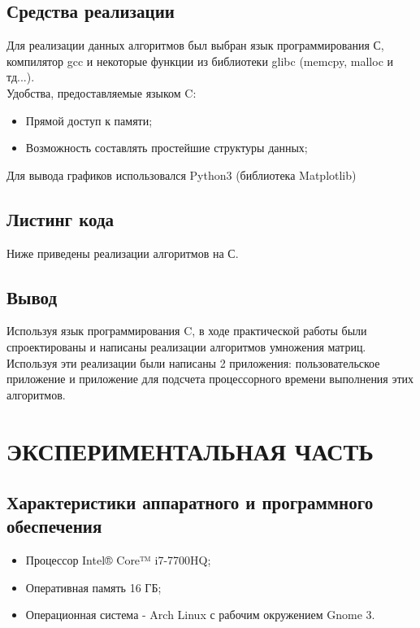 \documentclass[a4paper,12pt]{article}
\begin{document}
\newpage
\subsection{Средства реализации}
Для реализации данных алгоритмов был выбран язык программирования С, компилятор
gcc и некоторые функции из библиотеки glibc (memcpy, malloc и тд...). \\
Удобства, предоставляемые языком C:
\begin{itemize}
\item Прямой доступ к памяти;
\item Возможность составлять простейшие структуры данных;
\end{itemize}
Для вывода графиков использовался Python3 (библиотека Matplotlib)

\newpage
\subsection{Листинг кода}
Ниже приведены реализации алгоритмов на С.\\


\newpage


\newpage
\subsection{Вывод}
Используя язык программирования C, в ходе практической работы были спроектированы и написаны реализации алгоритмов умножения матриц. Используя эти реализации были написаны 2 приложения: пользовательское приложение и приложение для подсчета процессорного времени выполнения этих алгоритмов.

\newpage
\section{ЭКСПЕРИМЕНТАЛЬНАЯ ЧАСТЬ}
\subsection{Характеристики аппаратного и программного обеспечения}
\begin{itemize}
\item Процессор Intel® Core™ i7-7700HQ;
\item Оперативная память 16 ГБ;
\item Операционная система - Arch Linux с рабочим окружением Gnome 3.
\end{itemize}
\end{document}
